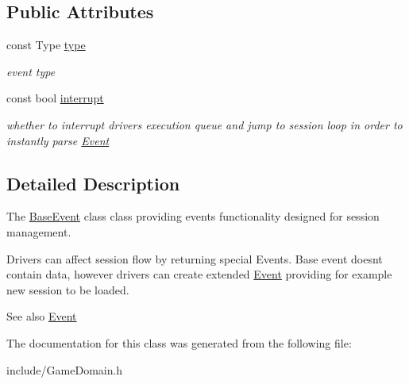 \subsection*{Public Attributes}
\begin{DoxyCompactItemize}
\item 
\hypertarget{classBaseEvent_ae3a93c75173a29e77f9c51ffe7d49a47}{}const Type \hyperlink{classBaseEvent_ae3a93c75173a29e77f9c51ffe7d49a47}{type}\label{classBaseEvent_ae3a93c75173a29e77f9c51ffe7d49a47}

\begin{DoxyCompactList}\small\item\em event type \end{DoxyCompactList}\item 
\hypertarget{classBaseEvent_a57cb919c14ba312f0a6c5e5bfdc52135}{}const bool \hyperlink{classBaseEvent_a57cb919c14ba312f0a6c5e5bfdc52135}{interrupt}\label{classBaseEvent_a57cb919c14ba312f0a6c5e5bfdc52135}

\begin{DoxyCompactList}\small\item\em whether to interrupt drivers execution queue and jump to session loop in order to instantly parse \hyperlink{classEvent}{Event} \end{DoxyCompactList}\end{DoxyCompactItemize}


\subsection{Detailed Description}
The \hyperlink{classBaseEvent}{Base\+Event} class class providing events functionality designed for session management. 

Drivers can affect session flow by returning special Events. Base event doesn\textquotesingle{}t contain data, however drivers can create extended \hyperlink{classEvent}{Event} providing for example new session to be loaded.

\begin{DoxySeeAlso}{See also}
\hyperlink{classEvent}{Event} 
\end{DoxySeeAlso}


The documentation for this class was generated from the following file\+:\begin{DoxyCompactItemize}
\item 
include/Game\+Domain.\+h\end{DoxyCompactItemize}

